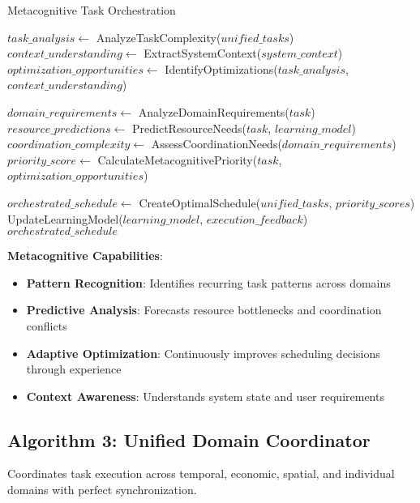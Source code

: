 \documentclass[12pt,a4paper]{article}
\begin{document}
\begin{algorithm}
\caption{Metacognitive Task Orchestration}
\begin{algorithmic}[1]
    \State $task\_analysis \gets$ AnalyzeTaskComplexity($unified\_tasks$)
    \State $context\_understanding \gets$ ExtractSystemContext($system\_context$)
    \State $optimization\_opportunities \gets$ IdentifyOptimizations($task\_analysis$, $context\_understanding$)
    
        \State $domain\_requirements \gets$ AnalyzeDomainRequirements($task$)
        \State $resource\_predictions \gets$ PredictResourceNeeds($task$, $learning\_model$)
        \State $coordination\_complexity \gets$ AssessCoordinationNeeds($domain\_requirements$)
        \State $priority\_score \gets$ CalculateMetacognitivePriority($task$, $optimization\_opportunities$)
    \EndFor
    
    \State $orchestrated\_schedule \gets$ CreateOptimalSchedule($unified\_tasks$, $priority\_scores$)
    \State UpdateLearningModel($learning\_model$, $execution\_feedback$)
    \State \Return $orchestrated\_schedule$
\EndProcedure
\end{algorithmic}
\end{algorithm}

\textbf{Metacognitive Capabilities}:
\begin{itemize}
\item \textbf{Pattern Recognition}: Identifies recurring task patterns across domains
\item \textbf{Predictive Analysis}: Forecasts resource bottlenecks and coordination conflicts
\item \textbf{Adaptive Optimization}: Continuously improves scheduling decisions through experience
\item \textbf{Context Awareness}: Understands system state and user requirements
\end{itemize}

\subsection{Algorithm 3: Unified Domain Coordinator}

Coordinates task execution across temporal, economic, spatial, and individual domains with perfect synchronization.
\end{document}

